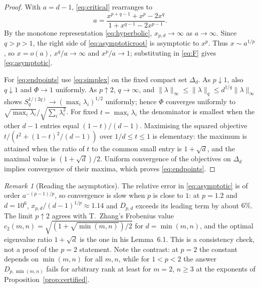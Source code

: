 \documentclass[11pt,a4paper]{article}
\numberwithin{equation}{section}
\theoremstyle{definition}
\theoremstyle{remark}
\newtheorem{remark}[theorem]{Remark}
\begin{document}
\begin{proof}
With \(a=d-1\), \eqref{eq:critical} rearranges to
\begin{equation}\label{eq:asymptoticroot}
 a=\frac{x^{p+q-1}+x^p-2x^q}{1+x^{q-1}-2x^{p-1}} .
\end{equation}
By the monotone representation \eqref{eq:hyperbolic}, \(x_{p,d}\to\infty\)
as \(a\to\infty\). Since \(q>p>1\), the right side of
\eqref{eq:asymptoticroot} is asymptotic to \(x^p\). Thus
\(x\sim a^{1/p}\), so \(x=o(a)\), \(x^q/a\to\infty\) and \(x^p/a\to1\);
substituting in \eqref{eq:F} gives \eqref{eq:asymptotic}.

For \eqref{eq:endpoints} use \eqref{eq:simplex} on the fixed compact set
\(\Delta_d\). As \(p\downarrow1\), also \(q\downarrow1\) and \(\Phi\to1\)
uniformly. As \(p\uparrow2\), \(q\to\infty\), and
\(\|\lambda\|_\infty\le\|\lambda\|_q\le d^{1/q}\|\lambda\|_\infty\) shows
\(S_q^{1/(2q)}\to(\max_i\lambda_i)^{1/2}\) uniformly; hence \(\Phi\)
converges uniformly to \(\sqrt{\max_i\lambda_i}/\sqrt{\sum_i\lambda_i^2}\).
For fixed \(t=\max_i\lambda_i\) the denominator is smallest when the other
\(d-1\) entries equal \((1-t)/(d-1)\). Maximising the squared objective
\(t/(t^2+(1-t)^2/(d-1))\) over \(1/d\le t\le1\) is elementary: the
maximum is attained when the ratio of \(t\) to the common small entry is
\(1+\sqrt d\), and the maximal value is \((1+\sqrt d)/2\). Uniform
convergence of the objectives on \(\Delta_d\) implies convergence of
their maxima, which proves \eqref{eq:endpoints}.
\end{proof}

\begin{remark}[Reading the asymptotics]\label{rem:slow}
The relative error in \eqref{eq:asymptotic} is of order
\(a^{-(p-1)/p}\), so convergence is slow when \(p\) is close to \(1\): at
\(p=1.2\) and \(d=10^6\), \(x_{p,d}/(d-1)^{1/p}\approx1.14\) and
\(D_{p,d}\) exceeds its leading term by about \(6\%\). The limit
\(p\uparrow2\) agrees with T.~Zhang's Frobenius value
\(c_2(m,n)=\sqrt{(1+\sqrt{\min(m,n)})/2}\) \cite[Theorem 6.2]{Zhang} for
\(d=\min(m,n)\), and the optimal eigenvalue ratio \(1+\sqrt d\) is the one
in his Lemma~6.1. This is a consistency check, not a proof of the \(p=2\)
statement. Note the contrast: at \(p=2\) the constant depends on
\(\min(m,n)\) for all \(m,n\), while for \(1<p<2\) the answer
\(D_{p,\min(m,n)}\) fails for arbitrary rank at least for \(m=2\),
\(n\ge3\) at the exponents of Proposition~\ref{prop:certified}.
\end{remark}
\end{document}
